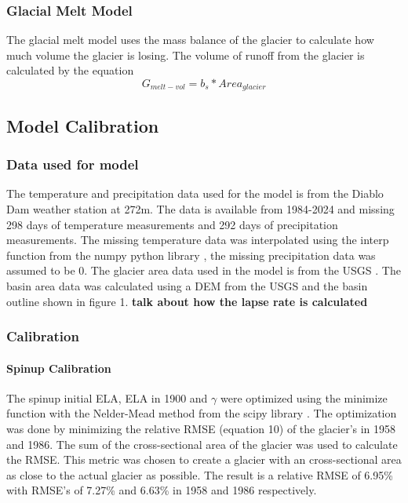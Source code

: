 \documentclass{article}
\begin{document}
\subsubsection{Glacial Melt Model}
The glacial melt model uses the mass balance of the glacier to calculate how much volume the glacier is losing. The volume of runoff from the 
glacier is calculated by the equation
\begin{equation}G_{melt-vol}=b_s*{Area}_{glacier}\end{equation}
\subsection{Model Calibration}
\subsubsection{Data used for model}
The temperature and precipitation data used for the model is from the Diablo Dam weather station at 272m. The data is available from 1984-2024 
and missing 298 days of temperature measurements and 292 days of precipitation measurements. The missing temperature data was interpolated 
using the interp function from the numpy python library \cite{ref7}, the missing precipitation data was assumed to be 0. The glacier area data used in 
the model is from the USGS \cite{ref8}. The basin area data was calculated using a DEM from the USGS and the basin outline shown in figure 1.
\textbf{talk about how the lapse rate is calculated}
\subsubsection{Calibration}
\paragraph{Spinup Calibration}
The spinup initial ELA, ELA in 1900 and $\gamma$ were optimized using the minimize function with the Nelder-Mead method from the scipy library \cite{ref9}.
The optimization was done by minimizing the relative RMSE (equation 10) of the glacier's in 1958 and 1986. The sum of the cross-sectional area of the glacier was used to calculate the RMSE. This metric was chosen to create a glacier with an cross-sectional area as close to the actual glacier as possible. 
The result is a relative RMSE of 6.95\% with RMSE's of 7.27\% and 6.63\% in 1958 and 1986 respectively.
\end{document}
